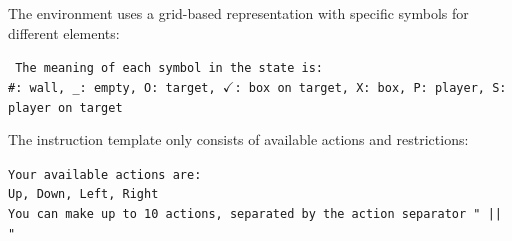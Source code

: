 


The environment uses a grid-based representation with specific symbols for different elements:

\begin{tcolorbox}[colback=gray!2, colframe=black, boxrule=0.5pt, arc=2pt, width=0.95\linewidth, title=Grid Representation]
\texttt{
The meaning of each symbol in the state is:\\
\#: wall, \_: empty, O: target, $\checkmark$: box on target, X: box, P: player, S: player on target\\
}
\end{tcolorbox}



The instruction template only consists of available actions and restrictions:

\begin{tcolorbox}[colback=gray!2, colframe=black, boxrule=0.5pt, arc=2pt, width=0.95\linewidth, title=Instruction Template]
\texttt{Your available actions are:\\
Up, Down, Left, Right\\
You can make up to 10 actions, separated by the action separator " || "
}
\end{tcolorbox}

